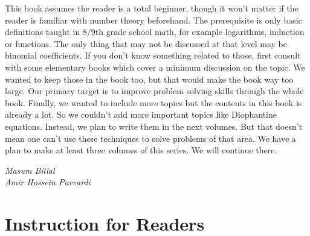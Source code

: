 \documentclass[main.tex]{subfile}
\begin{document}
	This book assumes the reader is a total beginner, though it won't matter if the reader is familiar with number theory beforehand. The prerequisite is only basic definitions taught in $8/9$th grade school math, for example logarithms, induction or functions. The only thing that may not be discussed at that level may be binomial coefficients. If you don't know something related to those, first consult with some elementary books which cover a minimum discussion on the topic. We wanted to keep those in the book too, but that would make the book way too large. Our primary target is to improve problem solving skills through the whole book. Finally, we wanted to include more topics but the contents in this book is already a lot. So we couldn't add more important topics like Diophantine equations. Instead, we plan to write them in the next volumes. But that doesn't mean one can't use these techniques to solve problems of that area. We have a plan to make at least three volumes of this series. We will continue there.
	
	\begin{flushright}
		\sl Masum Billal\\
		Amir Hossein Parvardi
	\end{flushright}
	
	
	\section*{Instruction for Readers}
\end{document}
